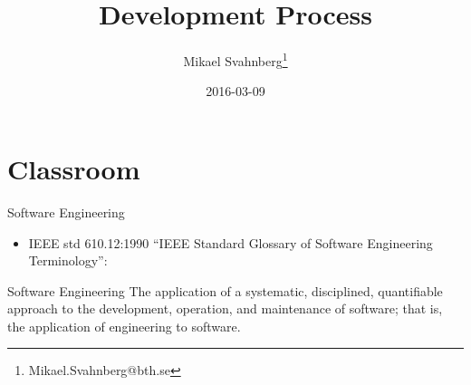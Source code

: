 \documentclass[10pt,t,a4paper]{beamer}
\author{Mikael Svahnberg\thanks{Mikael.Svahnberg@bth.se}}
\date{2016-03-09}
\title{Development Process}
\begin{document}
\maketitle

\section{Classroom}
\label{sec-1}
\begin{frame}[label=sec-1-1]{Software Engineering}
\begin{itemize}
\item IEEE std 610.12:1990 ``IEEE Standard Glossary of Software Engineering Terminology'':
\end{itemize}

\begin{block}{Software Engineering}
The application of a systematic, disciplined, quantifiable approach to the development, operation, and maintenance of software; that is, the application of engineering to software.
\end{block}
\end{frame}
\end{document}
